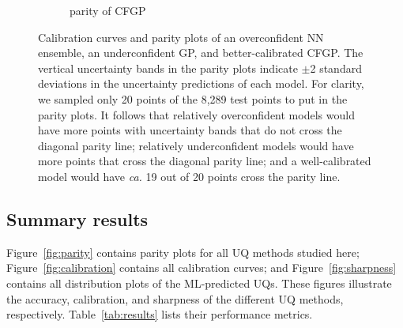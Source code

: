 \documentclass[]{achemso}
\begin{document}
\begin{figure}
\begin{subfigure}[b]{0.32\textwidth}
        \caption{parity of \gls{CFGP}}\label{fig:error_bar_cfgp}
    \end{subfigure}
    \caption{Calibration curves and parity plots of an overconfident \gls{NN} ensemble, an underconfident \gls{GP}, and better-calibrated \gls{CFGP}.
    The vertical uncertainty bands in the parity plots indicate $\pm$2 standard deviations in the uncertainty predictions of each model.
    For clarity, we sampled only 20 points of the 8,289 test points to put in the parity plots.
    It follows that relatively overconfident models would have more points with uncertainty bands that do not cross the diagonal parity line;
    relatively underconfident models would have more points that cross the diagonal parity line;
    and a well-calibrated model would have \textit{ca.} 19 out of 20 points cross the parity line.}\label{fig:error_bars}
\end{figure}

\subsection{Summary results}

Figure~\ref{fig:parity} contains parity plots for all \gls{UQ} methods studied here; Figure~\ref{fig:calibration} contains all calibration curves; and Figure~\ref{fig:sharpness} contains all distribution plots of the \gls{ML}-predicted \gls{UQ}s.
These figures illustrate the accuracy, calibration, and sharpness of the different \gls{UQ} methods, respectively.
Table~\ref{tab:results} lists their performance metrics.
\end{document}
